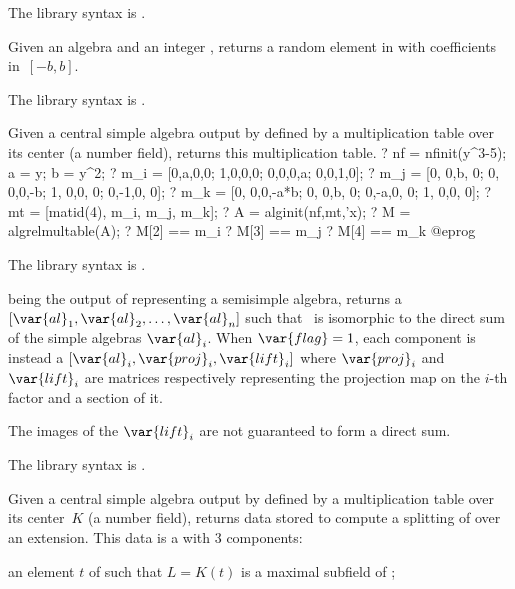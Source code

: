 The library syntax is .

\label{se:algrandom}
Given an algebra  and an integer , returns a random
element in  with coefficients in~$[-b,b]$.

The library syntax is .

\label{se:algrelmultable}
Given a central simple algebra  output by  defined by a multiplication table over its center (a number field), returns this multiplication table.
\bprog
? nf = nfinit(y^3-5); a = y; b = y^2;
? {m_i = [0,a,0,0;
          1,0,0,0;
          0,0,0,a;
          0,0,1,0];}
? {m_j = [0, 0,b, 0;
          0, 0,0,-b;
          1, 0,0, 0;
          0,-1,0, 0];}
? {m_k = [0, 0,0,-a*b;
          0, 0,b,   0;
          0,-a,0,   0;
          1, 0,0,   0];}
? mt = [matid(4), m_i, m_j, m_k];
? A = alginit(nf,mt,'x);
? M = algrelmultable(A);
? M[2] == m_i
? M[3] == m_j
? M[4] == m_k
@eprog

The library syntax is .

\label{se:algsimpledec}
 being the output of  representing a semisimple
algebra, returns a  $[\var{al}_1,\var{al}_2,\dots,\var{al}_n]$ such
that~ is isomorphic to the direct sum of the simple algebras
$\var{al}_i$. When $\var{flag}=1$, each component is instead a 
$[\var{al}_i,\var{proj}_i,\var{lift}_i]$ where $\var{proj}_i$
and~$\var{lift}_i$ are matrices respectively representing the projection map
on the $i$-th factor and a section of it.

 The images of the $\var{lift}_i$ are not guaranteed to form a direct sum.

The library syntax is .

\label{se:algsplittingdata}
Given a central simple algebra  output by  defined
by a multiplication table over its center~$K$ (a number field), returns data
stored to compute a splitting of  over an extension. This data is a
  with $3$ components:

 \item an element $t$ of  such that $L=K(t)$ is a maximal subfield
of ;


